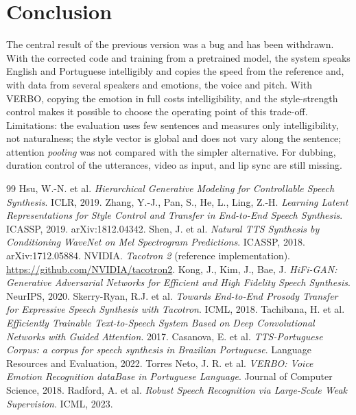 \documentclass[twocolumn,a4paper,10pt]{article}
\begin{document}
\section{Conclusion}
The central result of the previous version was a bug and has been withdrawn. With the corrected code and training from a pretrained model, the system speaks English and Portuguese intelligibly and copies the speed from the reference and, with data from several speakers and emotions, the voice and pitch. With VERBO, copying the emotion in full costs intelligibility, and the style-strength control makes it possible to choose the operating point of this trade-off. Limitations: the evaluation uses few sentences and measures only intelligibility, not naturalness; the style vector is global and does not vary along the sentence; attention \textit{pooling} was not compared with the simpler alternative. For dubbing, duration control of the utterances, video as input, and lip sync are still missing.

\begin{thebibliography}{99}\footnotesize\setlength{\itemsep}{1pt}\setlength{\parskip}{0pt}
 Hsu, W.-N. et al. \textit{Hierarchical Generative Modeling for Controllable Speech Synthesis}. ICLR, 2019.
 Zhang, Y.-J., Pan, S., He, L., Ling, Z.-H. \textit{Learning Latent Representations for Style Control and Transfer in End-to-End Speech Synthesis}. ICASSP, 2019. arXiv:1812.04342.
 Shen, J. et al. \textit{Natural TTS Synthesis by Conditioning WaveNet on Mel Spectrogram Predictions}. ICASSP, 2018. arXiv:1712.05884.
 NVIDIA. \textit{Tacotron 2} (reference implementation). \url{https://github.com/NVIDIA/tacotron2}.
 Kong, J., Kim, J., Bae, J. \textit{HiFi-GAN: Generative Adversarial Networks for Efficient and High Fidelity Speech Synthesis}. NeurIPS, 2020.
 Skerry-Ryan, R.J. et al. \textit{Towards End-to-End Prosody Transfer for Expressive Speech Synthesis with Tacotron}. ICML, 2018.
 Tachibana, H. et al. \textit{Efficiently Trainable Text-to-Speech System Based on Deep Convolutional Networks with Guided Attention}. 2017.
 Casanova, E. et al. \textit{TTS-Portuguese Corpus: a corpus for speech synthesis in Brazilian Portuguese}. Language Resources and Evaluation, 2022.
 Torres Neto, J. R. et al. \textit{VERBO: Voice Emotion Recognition dataBase in Portuguese Language}. Journal of Computer Science, 2018.
 Radford, A. et al. \textit{Robust Speech Recognition via Large-Scale Weak Supervision}. ICML, 2023.
\end{thebibliography}
\end{document}
